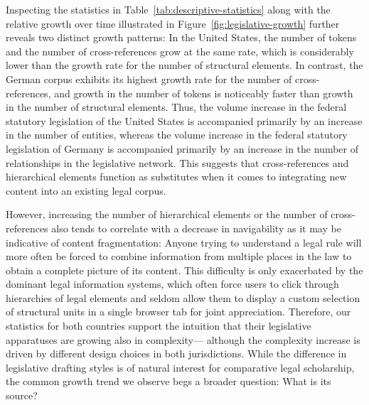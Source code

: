 Inspecting the statistics in Table~\ref{tab:descriptive-statistics} along with the relative growth over time illustrated in Figure~\ref{fig:legislative-growth} 
further reveals two distinct growth patterns:
In the United States, the number of tokens and the number of cross-references grow at the same rate, 
which is considerably lower than the growth rate for the number of structural elements. 
In contrast, the German corpus exhibits its highest growth rate for the number of cross-references, 
and growth in the number of tokens is noticeably faster than growth in the number of structural elements.
Thus, the volume increase in the federal statutory legislation of the United States is accompanied primarily by an increase in the number of entities, 
whereas the volume increase in the federal statutory legislation of Germany is accompanied primarily by an increase in the number of relationships in the legislative network. 
This suggests that cross-references and hierarchical elements function as substitutes when it comes to integrating new content into an existing legal corpus.

However, increasing the number of hierarchical elements or the number of cross-references also tends to correlate with a decrease in navigability as it may be indicative of content fragmentation: 
Anyone trying to understand a legal rule will more often be forced to combine information from multiple places in the law to obtain a complete picture of its content. 
This difficulty is only exacerbated by the dominant legal information systems, 
which often force users to click through hierarchies of legal elements and seldom allow them to display a custom selection of structural units in a single browser tab for joint appreciation.
Therefore, our statistics for both countries support the intuition that their legislative apparatuses are growing also in complexity---%
although the complexity increase is driven by different design choices in both jurisdictions. 
While the difference in legislative drafting styles is of natural interest for comparative legal scholarship, 
the common growth trend we observe begs a broader question: 
What is its source?

